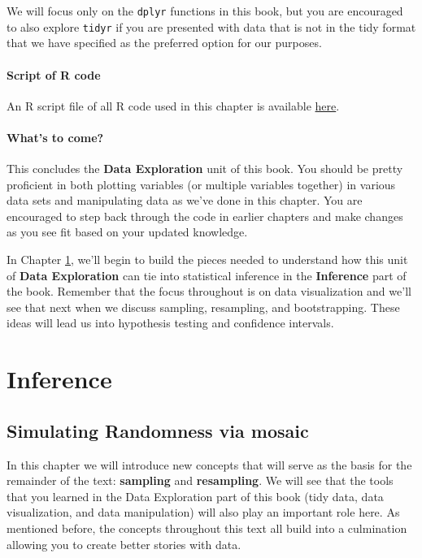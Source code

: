 \documentclass[]{tufte-book}
\begin{document}
We will focus only on the \texttt{dplyr} functions in this book, but you
are encouraged to also explore \texttt{tidyr} if you are presented with
data that is not in the tidy format that we have specified as the
preferred option for our purposes.

\subsection{Script of R code}\label{script-of-r-code-1}

An R script file of all R code used in this chapter is available
\href{http://ismayc.github.io/moderndiver-book/scripts/05-manip.R}{here}.

\subsection{What's to come?}\label{whats-to-come-2}

This concludes the \textbf{Data Exploration} unit of this book. You
should be pretty proficient in both plotting variables (or multiple
variables together) in various data sets and manipulating data as we've
done in this chapter. You are encouraged to step back through the code
in earlier chapters and make changes as you see fit based on your
updated knowledge.

In Chapter \ref{sim}, we'll begin to build the pieces needed to
understand how this unit of \textbf{Data Exploration} can tie into
statistical inference in the \textbf{Inference} part of the book.
Remember that the focus throughout is on data visualization and we'll
see that next when we discuss sampling, resampling, and bootstrapping.
These ideas will lead us into hypothesis testing and confidence
intervals.

\part{Inference}\label{part-inference}

\chapter{Simulating Randomness via mosaic}\label{sim}

In this chapter we will introduce new concepts that will serve as the
basis for the remainder of the text: \textbf{sampling} and
\textbf{resampling}. We will see that the tools that you learned in the
Data Exploration part of this book (tidy data, data visualization, and
data manipulation) will also play an important role here. As mentioned
before, the concepts throughout this text all build into a culmination
allowing you to create better stories with data.
\end{document}
